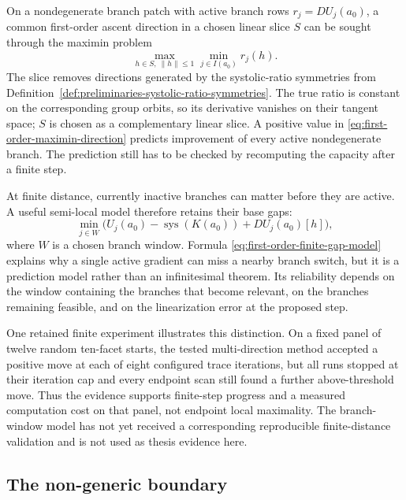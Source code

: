 On a nondegenerate branch patch with active branch rows
\(r_j=DU_j(a_0)\), a common first-order ascent direction in a chosen linear
slice \(S\) can be sought through the maximin problem
\begin{equation}\label{eq:first-order-maximin-direction}
  \max_{h\in S,\ \lVert h\rVert\leq1}
  \min_{j\in I(a_0)} r_j(h).
\end{equation}
The slice removes directions generated by the systolic-ratio symmetries from
Definition~\ref{def:preliminaries-systolic-ratio-symmetries}.  The true ratio
is constant on the corresponding group orbits, so its derivative vanishes on
their tangent space; \(S\) is chosen as a complementary linear slice.  A
positive value in
\eqref{eq:first-order-maximin-direction} predicts improvement of every active
nondegenerate branch.  The prediction still has to be checked by recomputing the
capacity after a finite step.

At finite distance, currently inactive branches can matter before they are
active.  A useful semi-local model therefore retains their base gaps:
\begin{equation}\label{eq:first-order-finite-gap-model}
  \min_{j\in W}
  \bigl(
    U_j(a_0)-\operatorname{sys}(K(a_0))+DU_j(a_0)[h]
  \bigr),
\end{equation}
where \(W\) is a chosen branch window.  Formula
\eqref{eq:first-order-finite-gap-model} explains why a single active gradient
can miss a nearby branch switch, but it is a prediction model rather than an
infinitesimal theorem.  Its reliability depends on the window containing the
branches that become relevant, on the branches remaining feasible, and on the
linearization error at the proposed step.

One retained finite experiment illustrates this distinction.  On a fixed
panel of twelve random ten-facet starts, the tested multi-direction
method accepted a positive move at each of eight configured trace iterations,
but all runs stopped at their iteration cap and every endpoint scan still
found a further above-threshold move.  Thus the evidence supports finite-step
progress and a measured computation cost on that panel, not endpoint local
maximality.  The branch-window model has not yet received a corresponding
reproducible
finite-distance validation and is not used as thesis evidence here.

\subsection{The non-generic boundary}
\label{subsec:first-order-nongeneric-boundary}

